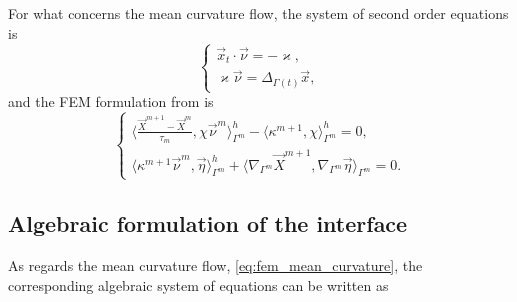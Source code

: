 \documentclass[a4paper,11pt, onecolumn]{article}
\begin{document}
For what concerns the mean curvature flow, the system of second order equations
is
\begin{equation}\label{eq:mean_curvature_sys}
 \begin{cases}
  \vec{x}_t\cdot\vec{\nu}=-\varkappa,\\
  \varkappa\vec{\nu}=\Delta_{\Gamma(t)}\vec{x},
 \end{cases}
\end{equation}
and the FEM formulation from \cite{gflows3d} is
\begin{equation}\label{eq:fem_mean_curvature}
 \begin{cases}
  \langle \frac{\vec{X}^{m + 1} - \vec{X}^{m}}{\tau_m},
  \chi\vec{\nu}^m\rangle_{\Gamma^m}^{h} - \langle\kappa^{m+1}, \chi
  \rangle_{\Gamma^m}^{h}=0,\\
  \langle\kappa^{m+1}\vec{\nu}^m, \vec{\eta}\rangle_{\Gamma^m}^{h} +
  \langle\nabla_{\Gamma^m}\vec{X}^{m + 1}, \nabla_{\Gamma^m}\vec{\eta}
  \rangle_{\Gamma^m}=0.
 \end{cases}
\end{equation}

\subsection{Algebraic formulation of the interface}

As regards the mean curvature flow, \eqref{eq:fem_mean_curvature}, the
corresponding algebraic system of equations can be written as
\end{document}
